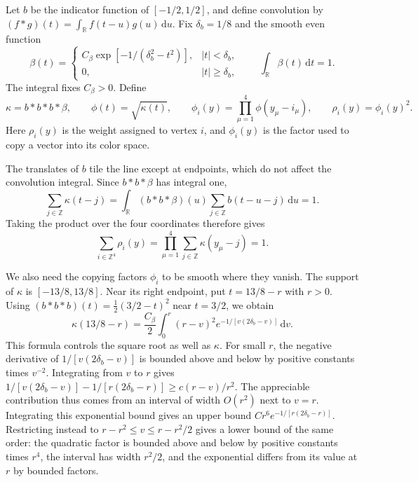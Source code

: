 \documentclass[11pt,a4paper]{article}
\theoremstyle{remark}
\newcommand{\dd}{\mathrm d}
\begin{document}
Let $b$ be the indicator function of $[-1/2,1/2]$, and define convolution
by $(f*g)(t)=\int_{\mathbb R}f(t-u)g(u)\,\dd u$. Fix
$\delta_b=1/8$ and the smooth even function
\begin{equation}
 \beta(t)=
 \begin{cases}
 C_\beta\exp[-1/(\delta_b^2-t^2)],&|t|<\delta_b,\\
 0,&|t|\ge\delta_b,
 \end{cases}
 \qquad \int_{\mathbb R}\beta(t)\,\dd t=1 .
\end{equation}
The integral fixes $C_\beta>0$. Define
\begin{equation}
 \kappa=b*b*b*\beta,\qquad
 \phi(t)=\sqrt{\kappa(t)},\qquad
 \phi_i(y)=\prod_{\mu=1}^4\phi(y_\mu-i_\mu),\qquad
 \rho_i(y)=\phi_i(y)^2 .
 \label{app:g:partition}
\end{equation}
Here $\rho_i(y)$ is the weight assigned to vertex $i$, and $\phi_i(y)$
is the factor used to copy a vector into its color space. 

The translates of $b$ tile the line except at endpoints, which do not
affect the convolution integral. Since $b*b*\beta$ has integral one,
\begin{equation}
 \sum_{j\in\mathbb Z}\kappa(t-j)
 =\int_{\mathbb R}(b*b*\beta)(u)
       \sum_{j\in\mathbb Z}b(t-u-j)\,\dd u=1 .
\end{equation}
Taking the product over the four coordinates therefore gives
\begin{equation}
 \sum_{i\in\mathbb Z^4}\rho_i(y)
 =\prod_{\mu=1}^4\sum_{j\in\mathbb Z}\kappa(y_\mu-j)=1 .
\end{equation}

We also need the copying factors $\phi_i$ to be smooth where they vanish. The support of $\kappa$ is
$[-13/8,13/8]$. Near its right endpoint, put $t=13/8-r$ with $r>0$.
Using $(b*b*b)(t)=\tfrac12(3/2-t)^2$ near $t=3/2$, we obtain
\begin{equation}
 \kappa(13/8-r)=\frac{C_\beta}{2}
       \int_0^r(r-v)^2e^{-1/[v(2\delta_b-v)]}\,\dd v.
\end{equation}
This formula controls the square root as well as $\kappa$. For small
$r$, the negative derivative of $1/[v(2\delta_b-v)]$ is bounded above
and below by positive constants times $v^{-2}$. Integrating from $v$ to
$r$ gives
$1/[v(2\delta_b-v)]-1/[r(2\delta_b-r)]\ge c(r-v)/r^2$.
The appreciable contribution thus comes from an interval of width
$O(r^2)$ next to $v=r$. Integrating this exponential bound gives an
upper bound $Cr^6e^{-1/[r(2\delta_b-r)]}$. Restricting instead to
$r-r^2\le v\le r-r^2/2$ gives a lower bound of the same order:
the quadratic factor is bounded above and below by positive constants
times $r^4$, the interval has width $r^2/2$,
and the exponential differs from its value at $r$ by bounded factors.
\end{document}
